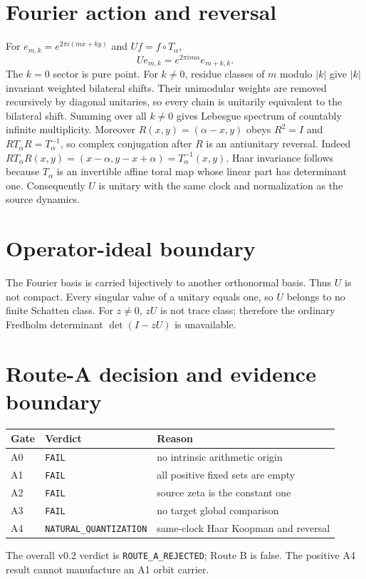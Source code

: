 \documentclass[10pt]{article}
\begin{document}
\section{Fourier action and reversal}
For $e_{m,k}=e^{2\pi i(mx+ky)}$ and $Uf=f\circ T_\alpha$,
\[
Ue_{m,k}=e^{2\pi i m\alpha}e_{m+k,k}.
\]
The $k=0$ sector is pure point.  For $k\ne0$, residue classes of $m$ modulo
$|k|$ give $|k|$ invariant weighted bilateral shifts.  Their unimodular
weights are removed recursively by diagonal unitaries, so every chain is
unitarily equivalent to the bilateral shift.  Summing over all $k\ne0$
gives Lebesgue spectrum of countably infinite multiplicity.  Moreover
$R(x,y)=(\alpha-x,y)$ obeys $R^2=I$ and
$RT_\alpha R=T_\alpha^{-1}$, so complex conjugation after $R$ is an
antiunitary reversal.
Indeed $RT_\alpha R(x,y)=(x-\alpha,y-x+\alpha)=T_\alpha^{-1}(x,y)$.
Haar invariance follows because $T_\alpha$ is an invertible affine toral map
whose linear part has determinant one.  Consequently $U$ is unitary with the
same clock and normalization as the source dynamics.
\section{Operator-ideal boundary}
The Fourier basis is carried bijectively to another orthonormal basis.  Thus
$U$ is not compact.  Every singular value of a unitary equals one, so $U$
belongs to no finite Schatten class.  For $z\ne0$, $zU$ is not trace class;
therefore the ordinary Fredholm determinant $\det(I-zU)$ is unavailable.
\section{Route-A decision and evidence boundary}
\begin{center}
\small
\begin{tabular}{lll}
\toprule
Gate&Verdict&Reason\\
\midrule
A0&\texttt{FAIL}&no intrinsic arithmetic origin\\
A1&\texttt{FAIL}&all positive fixed sets are empty\\
A2&\texttt{FAIL}&source zeta is the constant one\\
A3&\texttt{FAIL}&no target global comparison\\
A4&\texttt{NATURAL\_QUANTIZATION}&same-clock Haar Koopman and reversal\\
\bottomrule
\end{tabular}
\end{center}
The overall v0.2 verdict is \texttt{ROUTE\_A\_REJECTED}; Route B is false.
The positive A4 result cannot manufacture an A1 orbit carrier.
\end{document}
